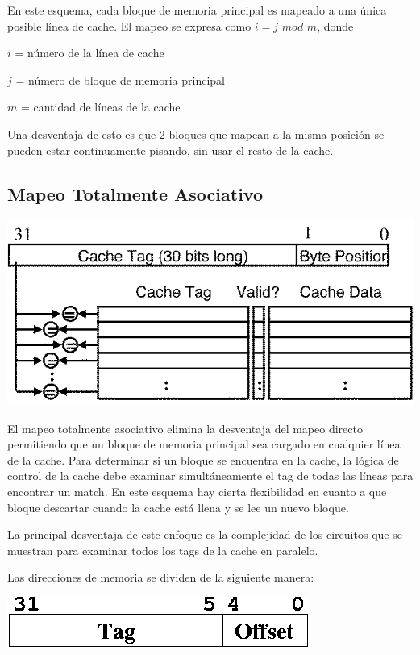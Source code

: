 En este esquema, cada bloque de memoria principal es mapeado a una \'unica posible l\'inea de cache. El mapeo se expresa como $i = j$ $mod$ $m$, donde

$i$ = n\'umero de la l\'inea de cache

$j$ = n\'umero de bloque de memoria principal

$m$ = cantidad de l\'ineas de la cache

Una desventaja de esto es que 2 bloques que mapean a la misma posici\'on se pueden estar continuamente pisando, sin usar el resto de la cache.


\subsection{Mapeo Totalmente Asociativo}

\begin{center}
\includegraphics[scale=3.4]{./Graficos/totalmente_asociativa.png} 
\end{center}

El mapeo totalmente asociativo elimina la desventaja del mapeo directo permitiendo que un bloque de memoria principal sea cargado 
en cualquier l\'inea de la cache. Para determinar si un bloque se encuentra en la cache, la l\'ogica de control de la cache debe examinar 
simult\'aneamente el tag de todas las l\'ineas para encontrar un match. En este esquema hay cierta flexibilidad en cuanto a que bloque 
descartar cuando la cache est\'a llena y se lee un nuevo bloque.

La principal desventaja de este enfoque es la complejidad de los circuitos que se muestran para examinar todos los tags de la cache en paralelo.

Las direcciones de memoria se dividen de la siguiente manera:

\begin{center}
\includegraphics[scale=0.4]{./Graficos/totalmente_asociativa_2.png} 
\end{center}

